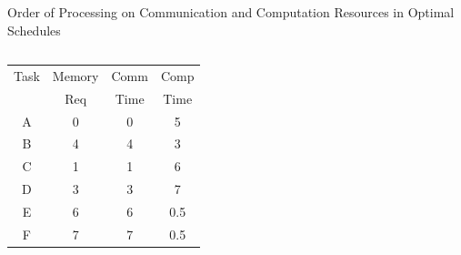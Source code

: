 \documentclass[mathserif,hyperref={pdfpagemode=FullScreen}]{beamer}
\newcommand{\task}[6][0]{
	\node[comm=#2 start #3 length #4 color #6]{};
	\node[comp=#2 start #3+#4+#1 length #5 color #6]{}; 
}
\begin{document}
\begin{frame}[fragile]{Order of Processing on Communication and Computation Resources in Optimal Schedules}
\begin{columns}

	
	\begin{column}[c]{.35\linewidth}
		\footnotesize
		\begin{center}
\begin{tabular}{|c|c|c|c|}
	\hline
	Task & Memory & Comm & Comp\\
	& Req & Time & Time\\ \hline 
	A & 0 & 0 & 5\\ \hline
	B & 4 & 4 & 3\\ \hline
	C & 1 & 1 & 6\\ \hline
	D & 3 & 3 & 7\\ \hline
	E & 6 & 6 & 0.5\\ \hline
	F & 7 & 7 & 0.5\\ \hline
\end{tabular}
		\end{center}
	\end{column}

	\newcommand{\taskA}[1]{\node[comp=$A$ start #1 length 5 color cyan] {};}
	\newcommand{\taskB}[2][0]{\task[#1]{$B$}{#2}{4}{3}{blue!25!white}}
	\newcommand{\taskC}[2][0]{\task[#1]{$C$}{#2}{1}{6}{blue!50!white}}
	\newcommand{\taskD}[2][0]{\task[#1]{$D$}{#2}{3}{7}{blue!75!white}}
	\newcommand{\taskE}[2][0]{\node[comm=$E$ start #2 length 6 color green!25!white]{};%
	\node[comp={} start #2+6+#1 length 0.5 color green!25!white]{};}
	\newcommand{\taskF}[2][0]{\node[comm=$F$ start #2 length 7 color green!50!white]{};%
	\node[comp={} start #2+7+#1 length 0.5 color green!50!white]{};}





\end{columns}
\end{frame}
\end{document}

